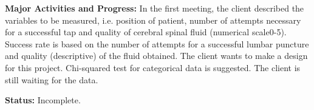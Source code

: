 \documentclass[12pt]{article}
\begin{document}
\vspace{.5cm}
{\bf Major Activities and Progress:}
In the first meeting, the client described the variables to be measured, i.e. position of patient, number of attempts necessary for a successful tap and quality of cerebral spinal fluid (numerical scale0-5). Success rate is based on the number of attempts for a successful lumbar puncture and quality (descriptive) of the fluid obtained. The client wants to make a design for this project. Chi-squared test for categorical data is suggested. The client is still waiting for the data.

 \vspace{0.5cm}
{\bf Status:}
Incomplete.
\end{document}
